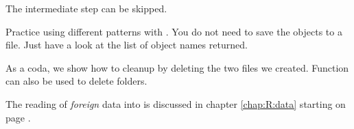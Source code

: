 \documentclass[krantz2]{krantz}\usepackage{knitr}%
\begin{document}
The intermediate step can be skipped.
\begin{knitrout}\footnotesize
{}\color{fgcolor}\begin{kframe}
\begin{alltt}
\hlstd{(} \hlstd{=} \hlstd{(} \hlstd{=} \hlstd{),}  \hlstd{=} \hlstd{)}
\end{alltt}
\end{kframe}
\end{knitrout}

\begin{playground}
Practice using different patterns with . You do not need to save the objects to a file. Just have a look at the list of object names returned.
\end{playground}

As a coda, we show how to cleanup by deleting the two files we created. Function  can also be used to delete folders.
\begin{knitrout}\footnotesize
{}\color{fgcolor}\begin{kframe}
\begin{alltt}
\hlstd{(}\hlstd{(}\hlstd{,} \hlstd{))}
\end{alltt}
\end{kframe}
\end{knitrout}

\begin{infobox}
The reading of \emph{foreign} data into \Rlang is discussed in chapter \ref{chap:R:data} starting on page \pageref{chap:R:data}.
\end{infobox}
\end{document}
